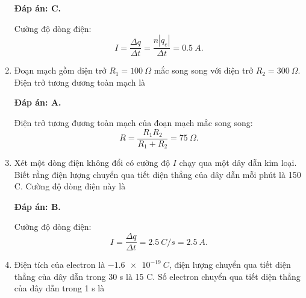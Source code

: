 \begin{enumerate}[label=\bfseries Câu \arabic*:]
{	}
	\loigiai
	{	\textbf{Đáp án: C.}
		
		Cường độ dòng điện:
		$$I=\dfrac{\Delta q}{\Delta t} = \dfrac{n |q_e|}{\Delta t} = \SI{0.5}{A}.$$
	}
	\item {}
	
	\cauhoi
	{Đoạn mạch gồm điện trở $R_1=\SI{100}{\Omega}$ mắc song song với điện trở $R_2=\SI{300}{\Omega}$. Điện trở tương đương toàn mạch là
		
	}
	\loigiai
	{	\textbf{Đáp án: A.}
		
		Điện trở tương đương toàn mạch của đoạn mạch mắc song song:
		$$R=\dfrac{R_1 R_2}{R_1 + R_2} = \SI{75}{\Omega}.$$
	}
	\item {}
	
	\cauhoi
	{Xét một dòng điện không đổi có cường độ $I$ chạy qua một dây dẫn kim loại. Biết rằng điện lượng chuyển qua tiết diện thẳng của dây dẫn mỗi phút là 150 C. Cường độ dòng điện này là
		
	}
	\loigiai
	{	\textbf{Đáp án: B.}
		
		Cường độ dòng điện:
		$$I=\dfrac{\Delta q}{\Delta t} = \SI{2.5}{C/s} = \SI{2.5}{A}.$$
	}
	\item {}
	
	\cauhoi
	{Điện tích của electron là $\SI{-1.6e-19}{C}$, điện lượng chuyển qua tiết diện thẳng của dây dẫn trong 30 s là 15 C. Số electron chuyển qua tiết diện thẳng của dây dẫn trong 1 s là
		
}
\end{enumerate}
